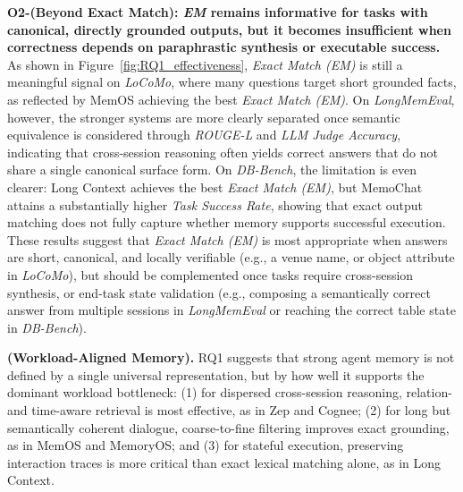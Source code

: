 \documentclass{llmxive}
\providecommand{\llm}{\textsc{LLM}\xspace}
\providecommand{\zw}[1]{#1}
\begin{document}
\noindent \textbf{O2-(Beyond Exact Match): \textit{EM} remains informative for tasks with canonical, directly grounded outputs, but it becomes insufficient when correctness depends on paraphrastic synthesis or executable success.}
As shown in Figure~\ref{fig:RQ1_effectiveness}, \textit{Exact Match (EM)} is still a meaningful signal on \textit{LoCoMo}, where many questions target short grounded facts, as reflected by MemOS achieving the best \textit{Exact Match (EM)}. 
On \textit{LongMemEval}, however, the stronger systems are more clearly separated once semantic equivalence is considered through \textit{ROUGE-L} and \textit{\llm Judge Accuracy}, indicating that cross-session reasoning often yields correct answers that do not share a single canonical surface form.
On \textit{DB-Bench}, the limitation is even clearer: Long Context achieves the best \textit{Exact Match (EM)}, but MemoChat attains a substantially higher \textit{Task Success Rate}, showing that exact output matching does not fully capture whether memory supports successful execution.
These results suggest that \textit{Exact Match (EM)} is most appropriate when answers are short, canonical, and locally verifiable (e.g., a venue name, or object attribute in \textit{LoCoMo}), but should be complemented once tasks require cross-session synthesis, or end-task state validation (e.g., composing a semantically correct answer from multiple sessions in \textit{LongMemEval} or reaching the correct table state in \textit{DB-Bench}).

\begin{findingbox}
\textbf{(Workload-Aligned Memory).}
RQ1 suggests that strong agent memory is not defined by a single universal representation, but by how well it supports the dominant workload bottleneck: (1) for dispersed cross-session reasoning, relation- and time-aware retrieval is most effective, as in Zep and Cognee; (2) for long but semantically coherent dialogue, coarse-to-fine filtering improves exact grounding, as in MemOS and MemoryOS; and (3) for stateful execution, preserving interaction traces is more critical than exact lexical matching alone, as in Long Context.
\end{findingbox}





\end{document}
